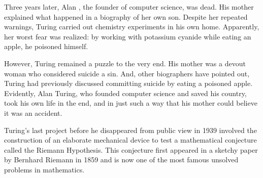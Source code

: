 Three years later, Alan , the founder of computer science,
was dead.  His mother explained what happened in a biography of her
own son.  Despite her repeated warnings, Turing carried out chemistry
experiments in his own home.  Apparently, her worst fear was realized:
by working with potassium cyanide while eating an apple, he poisoned
himself.

However, Turing remained a puzzle to the very end.  His mother was a
devout woman who considered suicide a sin.  And, other biographers
have pointed out, Turing had previously discussed committing suicide
by eating a poisoned apple.  Evidently, Alan Turing, who founded
computer science and saved his country, took his own life in the end,
and in just such a way that his mother could believe it was an
accident.

Turing's last project before he disappeared from public view in 1939
involved the construction of an elaborate mechanical device to test a
mathematical conjecture called the Riemann Hypothesis.  This
conjecture first appeared in a sketchy paper by Bernhard Riemann in
1859 and is now one of the most famous unsolved problems in
mathematics.

